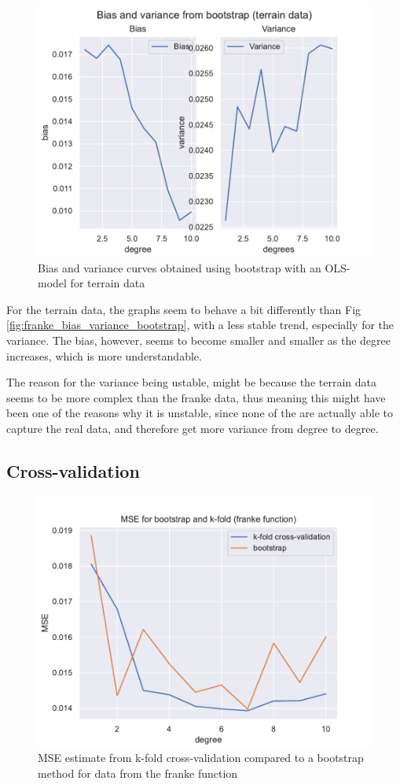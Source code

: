 \documentclass[12pt]{article}
\begin{document}
\begin{figure}[H]
    \centering
    \includegraphics[width=0.8\columnwidth]{../src/output/bootstrap_bias_variance_terrain_data.pdf}
    \caption{Bias and variance curves obtained using bootstrap with an OLS-model for terrain data}
    \label{fig:terrain_bias_variance_bootstrap}
\end{figure}

For the terrain data, the graphs seem to behave a bit differently than Fig \ref{fig:franke_bias_variance_bootstrap}, with a less stable trend, especially for the variance.
The bias, however, seems to become smaller and smaller as the degree increases, which is more understandable.

The reason for the variance being ustable, might be because the terrain data seems to be more complex than the franke data, thus meaning this might have been one of the reasons why it is unstable, since none of the are actually able to capture the real data, and therefore get more variance from degree to degree.


\subsection{Cross-validation}


\begin{figure}[H]
    \centering
    \includegraphics[width=0.7\columnwidth]{../src/output/bootstrap_cross_validation_franke_function.pdf}
    \caption{MSE estimate from k-fold cross-validation compared to a bootstrap method for data from the franke function}
    \label{fig:bootstrap_cross_validation_franke}
\end{figure}
\end{document}
